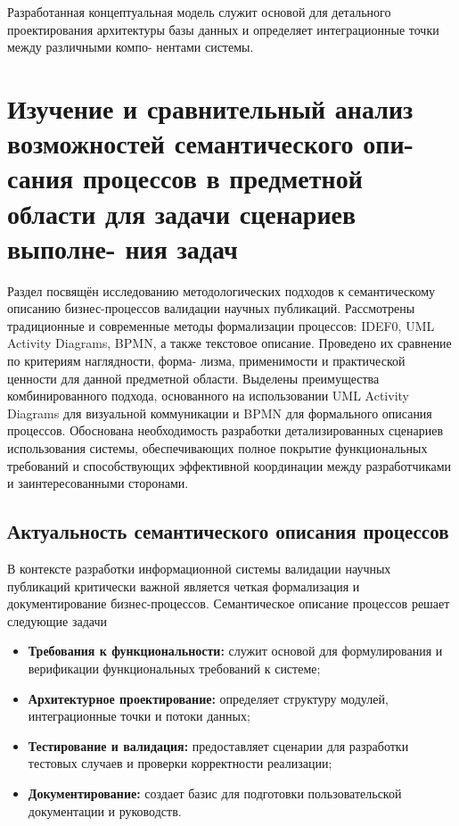 Разработанная концептуальная модель служит основой для детального проектирования
архитектуры базы данных и определяет интеграционные точки между различными компо-
нентами системы.

\section{Изучение и сравнительный анализ возможностей семантического опи-
сания процессов в предметной области для задачи сценариев выполне-
ния задач}

\begin{annotation}
	Раздел посвящён исследованию методологических подходов к семантическому 
	описанию бизнес-процессов валидации научных публикаций. Рассмотрены традиционные
	и современные методы формализации процессов: IDEF0, UML Activity Diagrams, BPMN, а
	также текстовое описание. Проведено их сравнение по критериям наглядности, форма-
	лизма, применимости и практической ценности для данной предметной области. Выделены
	преимущества комбинированного подхода, основанного на использовании UML Activity
	Diagrams для визуальной коммуникации и BPMN для формального описания процессов. 
	Обоснована необходимость разработки детализированных сценариев использования системы,
	обеспечивающих полное покрытие функциональных требований и способствующих эффективной 
	координации между разработчиками и заинтересованными сторонами.
\end{annotation}

\subsection{Актуальность семантического описания процессов}
В контексте разработки информационной системы валидации научных публикаций критически
важной является четкая формализация и документирование бизнес-процессов. Семантическое
описание процессов решает следующие задачи

\begin{itemize}
	\item \textbf{Требования к функциональности:} служит основой для формулирования и верификации функциональных требований к системе;
	\item \textbf{Архитектурное проектирование:} определяет структуру модулей, интеграционные точки и потоки данных;
	\item \textbf{Тестирование и валидация:} предоставляет сценарии для разработки тестовых случаев и проверки корректности реализации;
	\item \textbf{Документирование:} создает базис для подготовки пользовательской документации и руководств.
\end{itemize}

